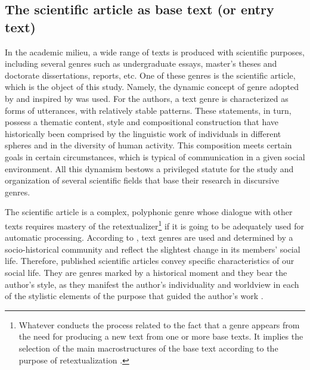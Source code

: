 \documentclass[english]{textolivre}
\begin{document}
\subsection{The scientific article as base text (or entry text)}\label{sec-fmt-manuscrito}
In the academic milieu, a wide range of texts is produced with scientific purposes, including several genres such as undergraduate essays, master’s theses and doctorate dissertations, reports, etc. One of these genres is the scientific article, which is the object of this study. Namely, the dynamic concept of genre adopted by \textcite[p. 21]{marcuschi_generos_2002} and inspired by \textcite{bakhtin_estetica_1997} was used. For the authors, a text genre is characterized as forms of utterances, with relatively stable patterns. These statements, in turn, possess a thematic content, style and compositional construction that have historically been comprised by the linguistic work of individuals in different spheres and in the diversity of human activity. This composition meets certain goals in certain circumstances, which is typical of communication in a given social environment. All this dynamism bestows a privileged statute for the study and organization of several scientific fields that base their research in discursive genres.

The scientific article is a complex, polyphonic genre whose dialogue with other texts requires mastery of the retextualizer\footnote{Whatever conducts the process related to the fact that a genre appears from the need for producing a new text from one or more base texts. It implies the selection of the main macrostructures of the base text according to the purpose of retextualization \cite{matencio_atividade_2002}.} if it is going to be adequately used for automatic processing.  According to \textcite{bakhtin_estetica_1997}, text genres are used and determined by a socio-historical community and reflect the slightest change in its members’ social life. Therefore, published scientific articles convey specific characteristics of our social life. They are genres marked by a historical moment and they bear the author’s style, as they manifest the author’s individuality and worldview in each of the stylistic elements of the purpose that guided the author’s work \cite[p. 298]{bakhtin_estetica_1997}.
\end{document}
